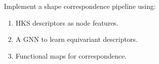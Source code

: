 \begin{exercise}
Implement a shape correspondence pipeline using:
\begin{enumerate}
    \item HKS descriptors as node features.
    \item A GNN to learn equivariant descriptors.
    \item Functional maps for correspondence.
\end{enumerate}
\end{exercise}
